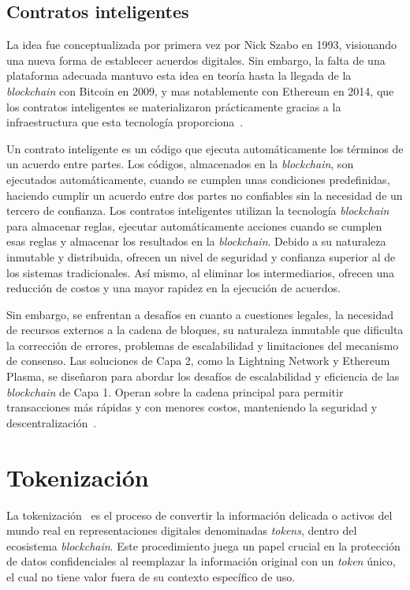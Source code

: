 \subsection{Contratos inteligentes}

La idea fue conceptualizada por primera vez por Nick Szabo en 1993, visionando una nueva forma de establecer acuerdos digitales. Sin embargo, la falta de una plataforma adecuada mantuvo esta idea en teoría hasta la llegada de la \textit{blockchain} con Bitcoin en 2009, y mas notablemente con Ethereum en 2014, que los contratos inteligentes se materializaron prácticamente gracias a la infraestructura que esta tecnología proporciona~\cite{smartcontractHistoria}.

Un contrato inteligente es un código que ejecuta automáticamente los términos de un acuerdo entre partes. Los códigos, almacenados en la \textit{blockchain}, son ejecutados automáticamente, cuando se cumplen unas condiciones predefinidas, haciendo cumplir un acuerdo entre dos partes no confiables sin la necesidad de un tercero de confianza.
Los contratos inteligentes utilizan la tecnología \textit{blockchain} para almacenar reglas, ejecutar automáticamente acciones cuando se cumplen esas reglas y almacenar los resultados en la \textit{blockchain}. Debido a su naturaleza inmutable y distribuida, ofrecen un nivel de seguridad y confianza superior al de los sistemas tradicionales. Así mismo, al eliminar los intermediarios, ofrecen una reducción de costos y una mayor rapidez en la ejecución de acuerdos.

Sin embargo, se enfrentan a desafíos en cuanto a cuestiones legales, la necesidad de recursos externos a la cadena de bloques, su naturaleza inmutable que dificulta la corrección de errores, problemas de escalabilidad y limitaciones del mecanismo de consenso. Las soluciones de Capa 2, como la Lightning Network y Ethereum Plasma, se diseñaron para abordar los desafíos de escalabilidad y eficiencia de las \textit{blockchain} de Capa 1. Operan sobre la cadena principal para permitir transacciones más rápidas y con menores costos, manteniendo la seguridad y descentralización~\cite{AplicacionesDesafiosSmartcontract}.



\section{Tokenización}

La tokenización~\cite{tokenización} es el proceso de convertir la información delicada o activos del mundo real en representaciones digitales denominadas \textit{tokens}, dentro del ecosistema \textit{blockchain}.
Este procedimiento juega un papel crucial en la protección de datos confidenciales al reemplazar la información original con un \textit{token} único, el cual no tiene valor fuera de su contexto específico de uso.

